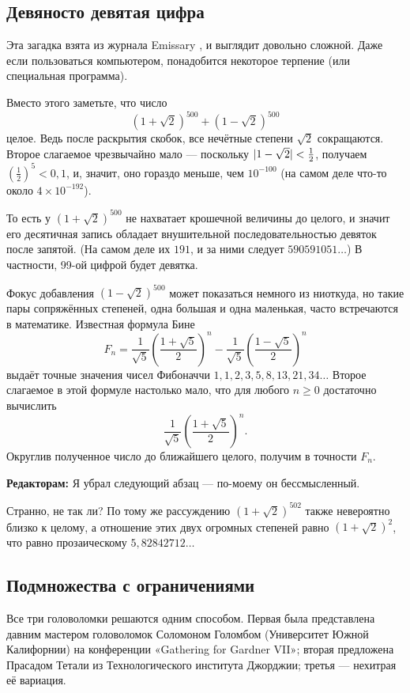 \subsection*{Девяносто девятая цифра}

Эта загадка взята из журнала Emissary \cite[осень 1999]{berlekamp-buhle}, и выглядит довольно сложной.
Даже если пользоваться компьютером, понадобится некоторое терпение (или специальная программа).

Вместо этого заметьте, что число
\[(1+\sqrt{2})^{500}+(1-\sqrt{2})^{500}\]
целое.
Ведь после раскрытия скобок, все нечётные степени $\sqrt{2}$ сокращаются.
Второе слагаемое чрезвычайно мало --- поскольку $|1-\sqrt{2}|\z<\tfrac12$, получаем $(\tfrac12)^5<0{,}1$, и, значит, оно гораздо меньше, чем $10^{-100}$ (на самом деле что-то около $4 \times 10^{-192}$).

То есть у $(1+\sqrt{2})^{500}$ не нахватает крошечной величины до целого, и значит его десятичная запись обладает внушительной последовательностью девяток после запятой.
(На самом деле их $191$, и за ними следует $590591051\dots$)
В частности, 99-ой цифрой будет девятка.

Фокус добавления $(1-\sqrt{2})^{500}$ может показаться немного из ниоткуда, но такие пары сопряжённых степеней, одна большая и одна маленькая, часто встречаются в математике.
Известная формула Бине
\[F_n=\frac{1}{\sqrt{5}}\left(\frac{1+\sqrt{5}}2\right)^n-\frac{1}{\sqrt{5}}\left(\frac{1-\sqrt{5}}2\right)^n\]
выдаёт точные значения чисел Фибоначчи $1, 1, 2, 3, 5, 8, 13, 21, 34 \dots$
Второе слагаемое в этой формуле настолько мало, что для любого $n \ge 0$ достаточно вычислить
\[\frac{1}{\sqrt{5}}\left(\frac{1+\sqrt{5}}2\right)^n.\]
Округлив полученное число до ближайшего целого, получим в точности $F_n$.

\begin{addedbytheeditors}
\textbf{Редакторам:}
Я убрал следующий абзац --- по-моему он бессмысленный.

Странно, не так ли?
По тому же рассуждению $(1+\sqrt{2})^{502}$ также невероятно близко к целому,
а отношение этих двух огромных степеней равно $(1+\sqrt{2})^{2}$, что равно прозаическому  $5{,}82842712\dots$
\end{addedbytheeditors}

\subsection*{Подмножества с ограничениями}

Все три головоломки решаются одним способом.
Первая была представлена давним мастером головоломок Соломоном Голомбом (Университет Южной Калифорнии) на конференции
«Ga\-the\-ring for Gard\-ner VII»;
вторая предложена Прасадом Тетали из Технологического института Джорджии;
третья --- нехитрая её вариация.

